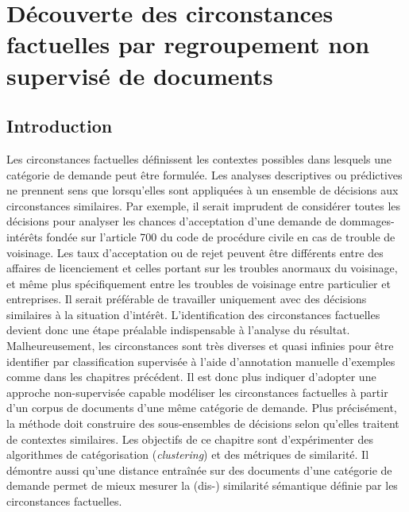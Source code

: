  \chapter{Découverte des circonstances factuelles par regroupement non supervisé de documents}
\label{chap:similarite}

\section{Introduction}
\label{sec:similarite:introduction}
Les circonstances factuelles définissent les contextes possibles dans lesquels une catégorie de demande peut être formulée. Les analyses descriptives ou prédictives ne prennent sens que lorsqu'elles sont appliquées à un ensemble de décisions aux circonstances similaires. Par exemple, il serait imprudent de considérer toutes les décisions pour analyser les chances d'acceptation d'une demande de dommages-intérêts fondée sur l'\og article 700 du code de procédure civile \fg{} en cas de trouble de voisinage. Les taux d'acceptation ou de rejet peuvent être différents entre des affaires de licenciement et celles portant sur les troubles anormaux du voisinage, et même plus spécifiquement entre les troubles de voisinage entre particulier et entreprises. %
 Il serait préférable de travailler uniquement avec des décisions similaires à la situation d'intérêt. L'identification des circonstances factuelles devient donc une étape préalable indispensable à l'analyse du résultat. Malheureusement, les circonstances sont très diverses et quasi infinies pour être identifier par classification supervisée à l'aide d'annotation manuelle d'exemples comme dans les chapitres précédent. Il est donc plus indiquer d'adopter une approche non-supervisée capable modéliser les circonstances factuelles à partir d'un corpus de documents d'une même catégorie de demande. Plus précisément, la méthode doit construire des sous-ensembles de décisions selon qu'elles traitent de contextes similaires.  Les objectifs de ce chapitre sont d'expérimenter des algorithmes  de catégorisation (\textit{clustering}) et des métriques de similarité. Il démontre aussi qu'une distance entraînée  sur des documents d'une catégorie de demande permet de mieux mesurer la (dis-) similarité sémantique définie par les circonstances factuelles.


